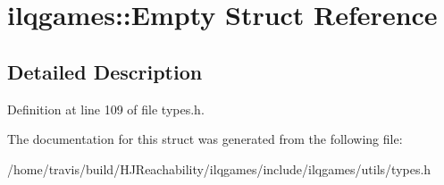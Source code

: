 \hypertarget{structilqgames_1_1_empty}{}\section{ilqgames\+:\+:Empty Struct Reference}
\label{structilqgames_1_1_empty}


\subsection{Detailed Description}


Definition at line 109 of file types.\+h.



The documentation for this struct was generated from the following file\+:\begin{DoxyCompactItemize}
\item 
/home/travis/build/\+H\+J\+Reachability/ilqgames/include/ilqgames/utils/types.\+h\end{DoxyCompactItemize}
